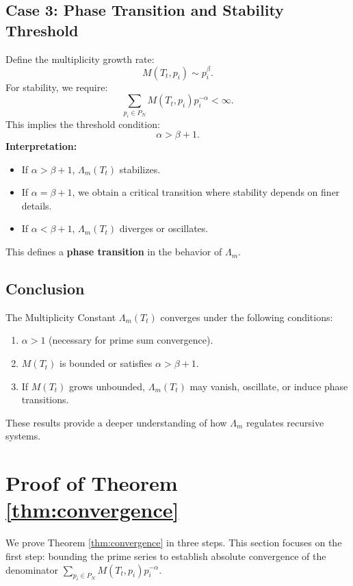 \documentclass{article}
\theoremstyle{plain}
\begin{document}
\subsection{Case 3: Phase Transition and Stability Threshold}
Define the multiplicity growth rate:
\begin{equation}
    M(T_t, p_i) \sim p_i^{\beta}.
\end{equation}
For stability, we require:
\begin{equation}
    \sum_{p_i \in P_N} M(T_t, p_i) p_i^{-\alpha} < \infty.
\end{equation}
This implies the threshold condition:
\begin{equation}
    \alpha > \beta + 1.
\end{equation}
\textbf{Interpretation:}
\begin{itemize}
    \item If \( \alpha > \beta + 1 \), \( \Lambda_m(T_t) \) stabilizes.
    \item If \( \alpha = \beta + 1 \), we obtain a critical transition where stability depends on finer details.
    \item If \( \alpha < \beta + 1 \), \( \Lambda_m(T_t) \) diverges or oscillates.
\end{itemize}
This defines a \textbf{phase transition} in the behavior of \( \Lambda_m \).

\subsection{Conclusion}
The Multiplicity Constant \( \Lambda_m(T_t) \) converges under the following conditions:
\begin{enumerate}
    \item \( \alpha > 1 \) (necessary for prime sum convergence).
    \item \( M(T_t) \) is bounded or satisfies \( \alpha > \beta + 1 \).
    \item If \( M(T_t) \) grows unbounded, \( \Lambda_m(T_t) \) may vanish, oscillate, or induce phase transitions.
\end{enumerate}
These results provide a deeper understanding of how \( \Lambda_m \) regulates recursive systems.

\section{Proof of Theorem \ref{thm:convergence}}

We prove Theorem \ref{thm:convergence} in three steps. This section focuses on the first step: bounding the prime series to establish absolute convergence of the denominator \( \sum_{p_i \in P_N} M(T_t, p_i) p_i^{-\alpha} \).
\end{document}
